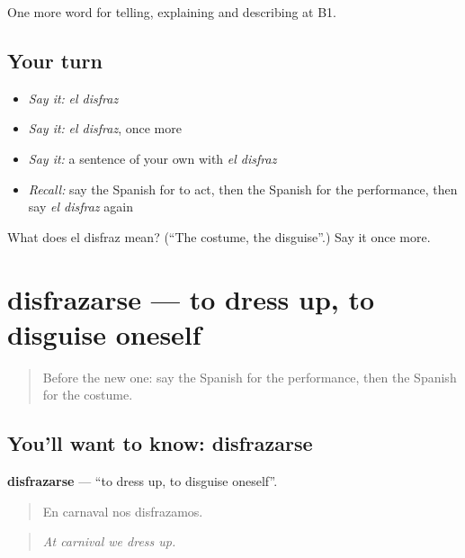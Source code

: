 \begin{grammarlens}[title={What you've built}]
One more word for telling, explaining and describing at B1.
\end{grammarlens}

\subsection*{Your turn}
\begin{itemize}
\raggedright
  \item \emph{Say it:} \emph{el disfraz}
  \item \emph{Say it:} \emph{el disfraz}, once more
  \item \emph{Say it:} a sentence of your own with \emph{el disfraz}
  \item \emph{Recall:} say the Spanish for to act, then the Spanish for the performance, then say \emph{el disfraz} again
\end{itemize}

\begin{tcolorbox}[breakable,colback=teal!4,colframe=teal!35!black,title={Before you move on}]
What does el disfraz mean? (\textquotedblleft{}The costume, the disguise\textquotedblright{}.) Say it once more.
\end{tcolorbox}
\section[disfrazarse]{disfrazarse — to dress up, to disguise oneself}

\label{lesson:ES-C760-disfrazarse}



\begin{quote}
Before the new one: say the Spanish for the performance, then the Spanish for the costume.
\end{quote}

\subsection*{You'll want to know: disfrazarse}
\textbf{disfrazarse} — \textquotedblleft{}to dress up, to disguise oneself\textquotedblright{}.

\begin{quote}
En carnaval nos disfrazamos.
\end{quote}

\begin{quote}
\emph{At carnival we dress up.}
\end{quote}

